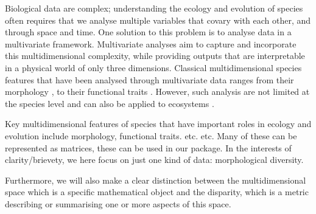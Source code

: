 \documentclass[12pt,letterpaper]{article}
\begin{document}






Biological data are complex; understanding the ecology and evolution of species often requires that we analyse multiple variables that covary with each other, and through space and time.
One solution to this problem is to analyse data in a multivariate framework.
Multivariate analyses aim to capture and incorporate this multidimensional complexity, while providing outputs that are interpretable in a physical world of only three dimensions.
Classical multidimensional species features that have been analysed through multivariate data ranges from their morphology \citep{raup1966geometric}, to their functional traits \citep{diaz2016global}.
However, such analysis are not limited at the species level and can also be applied to ecosystems \citep{DonohueDim}.

Key multidimensional features of species that have important roles in ecology and evolution include morphology, functional traits. etc. etc.
Many of these can be represented as matrices, these can be used in our package.
In the interests of clarity/brievety, we here focus on just one kind of data: morphological diversity.


Furthermore, we will also make a clear distinction between the multidimensional space which is a specific mathematical object and the disparity, which is a metric describing or summarising one or more aspects of this space.
\end{document}

